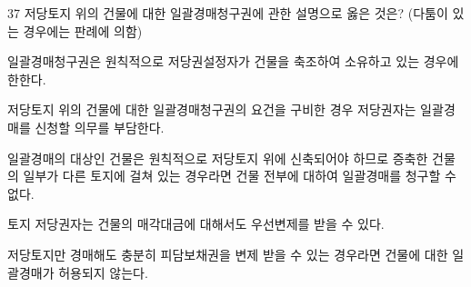 \begin{question}{37}
저당토지 위의 건물에 대한 일괄경매청구권에 관한 설명으로 옳은 것은? (다툼이 있는 경우에는 판례에 의함)
\begin{choices}
  \item 일괄경매청구권은 원칙적으로 저당권설정자가 건물을 축조하여 소유하고 있는 경우에 한한다.
  \item 저당토지 위의 건물에 대한 일괄경매청구권의 요건을 구비한 경우 저당권자는 일괄경매를 신청할 의무를 부담한다.
  \item 일괄경매의 대상인 건물은 원칙적으로 저당토지 위에 신축되어야 하므로 증축한 건물의 일부가 다른 토지에 걸쳐 있는 경우라면 건물 전부에 대하여 일괄경매를 청구할 수 없다.
  \item 토지 저당권자는 건물의 매각대금에 대해서도 우선변제를 받을 수 있다.
  \item 저당토지만 경매해도 충분히 피담보채권을 변제 받을 수 있는 경우라면 건물에 대한 일괄경매가 허용되지 않는다.
\end{choices}
\end{question}
